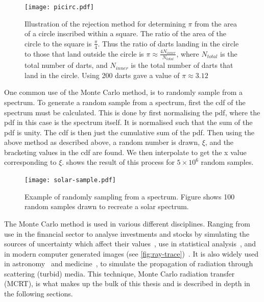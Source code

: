 \begin{figure}[!htbp]
    \centering
    \texttt{[image: picirc.pdf]}
    \caption{Illustration of the rejection method for determining $\pi$ from the area of a circle inscribed within a square. The ratio of the area of the circle to the square is $\tfrac{\pi}{4}$. Thus the ratio of darts landing in the circle to those that land outside the circle is $\pi \approx \tfrac{4N_{inner}}{N_{total}}$, where $N_{total}$ is the total number of darts, and $N_{inner}$ is the total number of darts that land in the circle. Using 200 darts gave a value of $\pi \approx 3.12$}
    \label{fig:picircle}
\end{figure}


One common use of the Monte Carlo method, is to randomly sample from a spectrum.
To generate a random sample from a spectrum, first the \gls*{cdf} of the spectrum must be calculated.
This is done by first normalising the \gls*{pdf}, where the \gls*{pdf} in this case is the spectrum itself.
It is normalised such that the sum of the \gls*{pdf} is unity.
The \gls*{cdf} is then just the cumulative sum of the \gls*{pdf}.
Then using the above method as described above, a random number is drawn, $\xi$, and the bracketing values in the \gls*{cdf} are found.
We then interpolate to get the x value corresponding to $\xi$.
 shows the result of this process for $5\times10^6$ random samples.

\begin{figure}[!htbp]
    \centering
    \texttt{[image: solar-sample.pdf]}
    \caption{Example of randomly sampling from a spectrum. Figure shows 100 random samples drawn to recreate a solar spectrum.}
    \label{fig:solar}
\end{figure}

The Monte Carlo method is used in various different disciplines. Ranging from use in the financial sector to analyse investments and stocks by simulating the sources of uncertainty which affect their values~\cite{jackel2002monte,finaceprrof}, use in statistical analysis~\cite{wall2012practical}, and in modern computer generated images (see \cref{fig:ray-trace})~\cite{Kajiyarendering,Cookraytracing}. It is also widely used in astronomy~\cite{robitaille2011hyperion,harries2014torus} and medicine~\cite{valentine2011monte,campbell2015monte}, to simulate the propagation of radiation through scattering (turbid) media. This technique, Monte Carlo radiation transfer (MCRT), is what makes up the bulk of this thesis and is described in depth in the following sections.

